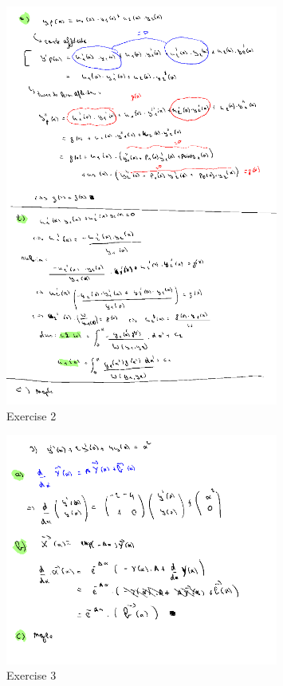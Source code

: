 \documentclass[a4paper]{report}
\begin{document}


\begin{figure}[H]
	\centering
	\includegraphics[width=0.8\textwidth]{assets/bord_8_ex_2.png}
	\caption{Exercise 2}
	\label{fig:bord_8_ex_2}
\end{figure}



\begin{figure}[H]
	\centering
	\includegraphics[width=0.8\textwidth]{assets/bord_8_ex_3.png}
	\caption{Exercise 3}
	\label{fig:bord_8_ex_3}
\end{figure}
\end{document}

